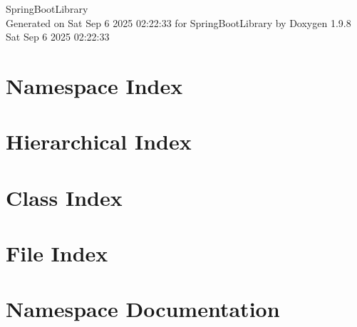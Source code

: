 \documentclass[twoside]{book}
\newcommand{\+}{\discretionary{\mbox{\scriptsize$\hookleftarrow$}}{}{}}
\newcommand{\clearemptydoublepage}{%
    \newpage{\pagestyle{empty}\cleardoublepage}%
  }
\begin{document}
  \raggedbottom
    \hypersetup{pageanchor=false,
                bookmarksnumbered=true,
                pdfencoding=unicode
               }
  \begin{titlepage}
  \vspace*{7cm}
  \begin{center}%
  {\Large Spring\+Boot\+Library}\\
  \vspace*{1cm}
  {\large Generated on Sat Sep 6 2025 02\+:22\+:33 for Spring\+Boot\+Library by Doxygen 1.9.8}\\
    \vspace*{0.5cm}
    {\small Sat Sep 6 2025 02:22:33}
  \end{center}
  \end{titlepage}
  \clearemptydoublepage
  \tableofcontents
  \clearemptydoublepage
  \hypersetup{pageanchor=true}

\chapter{Namespace Index}

\chapter{Hierarchical Index}

\chapter{Class Index}

\chapter{File Index}

\chapter{Namespace Documentation}









\end{document}
